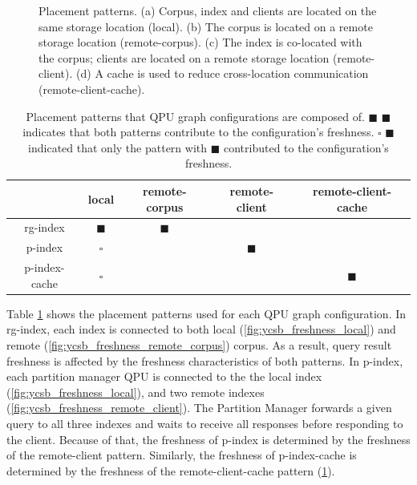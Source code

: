 \begin{figure}[H]
\begin{subfigure}{0.24\textwidth}
    \caption{}
    \label{fig:ycsb_freshness_remote_client_cache}
  \end{subfigure}%
  \caption{Placement patterns. (a) Corpus, index and clients are located on the same storage location (local).
  (b) The corpus is located on a remote storage location (remote-corpus). (c) The index is co-located with the corpus;
  clients are located on a remote storage location (remote-client). (d) A cache is used to reduce cross-location communication (remote-client-cache).}
  \label{fig:placement_patterns}
\end{figure}

\begin{table}[H]
\centering
\begin{tabular}{|c||c|c|c|c||}
\hline
& local & remote-corpus & remote-client & remote-client-cache \\
\hline
rg-index & $\blacksquare$ & $\blacksquare$ &  & \\
\hline
p-index & $\square$ & & $\blacksquare$ & \\
\hline
p-index-cache & $\square$ & &  & $\blacksquare$ \\
\hline
\end{tabular}
\caption{Placement patterns that QPU graph configurations are composed of.
$\blacksquare$ $\blacksquare$ indicates that both patterns contribute to the configuration's freshness.
$\square$ $\blacksquare$ indicated that only the pattern with $\blacksquare$ contributed to the configuration's freshness.}
\label{tab:placement_patterns}
\end{table}

Table \ref{tab:placement_patterns} shows the placement patterns used for each QPU graph configuration.
In rg-index, each index is connected to both local (\ref{fig:ycsb_freshness_local}) and remote (\ref{fig:ycsb_freshness_remote_corpus}) corpus.
As a result, query result freshness is affected by the freshness characteristics of both patterns.
In p-index, each partition manager QPU is connected to the the local index (\ref{fig:ycsb_freshness_local}),
and two remote indexes (\ref{fig:ycsb_freshness_remote_client}).
The Partition Manager forwards a given query to all three indexes and waits to receive all responses before responding to
the client.
Because of that, the freshness of p-index is determined by the freshness of the remote-client pattern.
Similarly, the freshness of p-index-cache is determined by the freshness of the remote-client-cache pattern
(\ref{fig:ycsb_freshness_remote_client_cache}).

